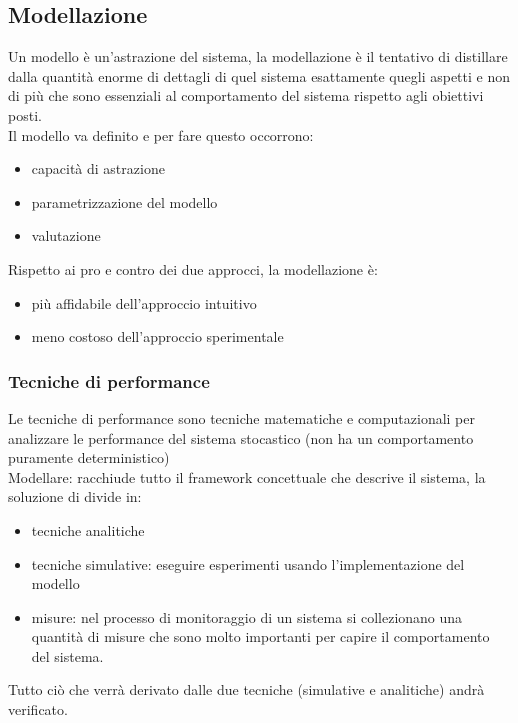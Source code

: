 \documentclass{article}
\begin{document}
\subsection{Modellazione}
Un modello è un'astrazione del sistema, la modellazione è il tentativo di distillare dalla quantità enorme di dettagli di quel sistema esattamente quegli aspetti e non di più che sono essenziali al comportamento del sistema rispetto agli obiettivi posti.\\ Il modello va definito e per fare questo occorrono:
\begin{itemize}
\item capacità di astrazione
\item parametrizzazione del modello
\item valutazione
\end{itemize}
Rispetto ai pro e contro dei due approcci, la modellazione è:
\begin{itemize}
\item più affidabile dell'approccio intuitivo
\item meno costoso dell'approccio sperimentale
\end{itemize}
\subsubsection{Tecniche di performance} 
Le tecniche di performance sono tecniche matematiche e computazionali per analizzare le performance del sistema stocastico (non ha un comportamento puramente deterministico)\\ Modellare: racchiude tutto il framework concettuale che descrive il sistema, la soluzione di divide in:
\begin{itemize}
\item tecniche analitiche
\item tecniche simulative: eseguire esperimenti usando l'implementazione del modello
\item misure: nel processo di monitoraggio di un sistema si collezionano una quantità di misure che sono molto importanti per capire il comportamento del sistema.
\end{itemize}
Tutto ciò che verrà derivato dalle due tecniche (simulative e analitiche) andrà verificato.
\end{document}
